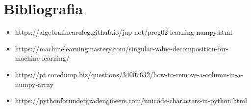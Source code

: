 \documentclass[a4paper,12pt,twoside]{article}
\begin{document}
\section{Bibliografia}
\begin{itemize}
   \item https://algebralinearufcg.github.io/jup-not/prog02-learning-numpy.html
   \item https://machinelearningmastery.com/singular-value-decomposition-for-machine-learning/
   \item https://pt.coredump.biz/questions/34007632/how-to-remove-a-column-in-a-numpy-array
   \item https://pythonforundergradengineers.com/unicode-characters-in-python.html
 \end{itemize}
\end{document}
